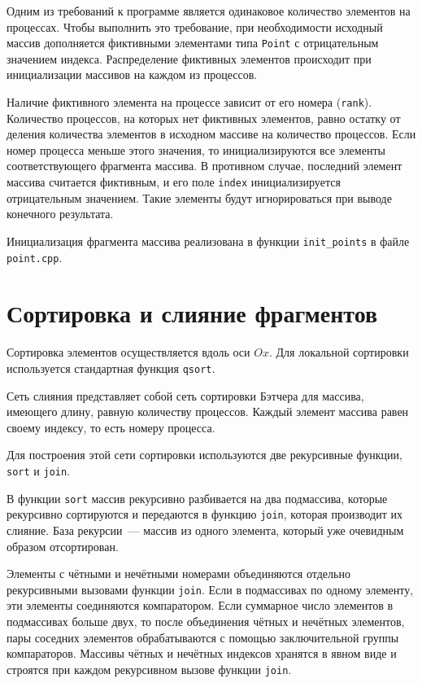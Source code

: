 \documentclass[oneside,final,14pt]{extreport}
\begin{document}
Одним из требований к программе является одинаковое количество элементов
на процессах. Чтобы выполнить это требование, при необходимости
исходный массив дополняется фиктивными элементами типа \texttt{Point} с
отрицательным значением индекса. Распределение фиктивных элементов происходит
при инициализации массивов на каждом из процессов.

Наличие фиктивного элемента на процессе зависит от его номера (\texttt{rank}).
Количество процессов, на которых нет фиктивных элементов, равно остатку от
деления количества элементов в исходном массиве на количество процессов.
Если номер процесса меньше этого значения, то инициализируются все элементы
соответствующего фрагмента массива. В противном случае, последний элемент
массива считается фиктивным, и его поле \texttt{index} инициализируется
отрицательным значением. Такие элементы будут игнорироваться при выводе
конечного результата.

Инициализация фрагмента массива реализована в функции
\texttt{init\_points} в файле \texttt{point.cpp}.

\section*{Сортировка и слияние фрагментов}

Сортировка элементов осуществляется вдоль оси $Ox$. Для локальной
сортировки используется стандартная функция \texttt{qsort}.

Сеть слияния представляет собой сеть сортировки Бэтчера для массива, имеющего
длину, равную количеству процессов. Каждый элемент массива равен своему индексу,
то есть номеру процесса.

Для построения этой сети сортировки используются две рекурсивные функции,
\texttt{sort} и \texttt{join}.

В функции \texttt{sort} массив рекурсивно разбивается на два подмассива,
которые рекурсивно сортируются и передаются в функцию \texttt{join}, которая
производит их слияние. База рекурсии~--- массив из одного элемента,
который уже очевидным образом отсортирован.

Элементы с чётными и нечётными номерами объединяются отдельно рекурсивными
вызовами функции \texttt{join}. Если в подмассивах по одному элементу,
эти элементы соединяются компаратором. Если суммарное число элементов в
подмассивах больше двух, то после объединения чётных и нечётных элементов,
пары соседних элементов обрабатываются с помощью заключительной
группы компараторов. Массивы чётных и нечётных индексов хранятся в явном виде
и строятся при каждом рекурсивном вызове функции \texttt{join}.
\end{document}

